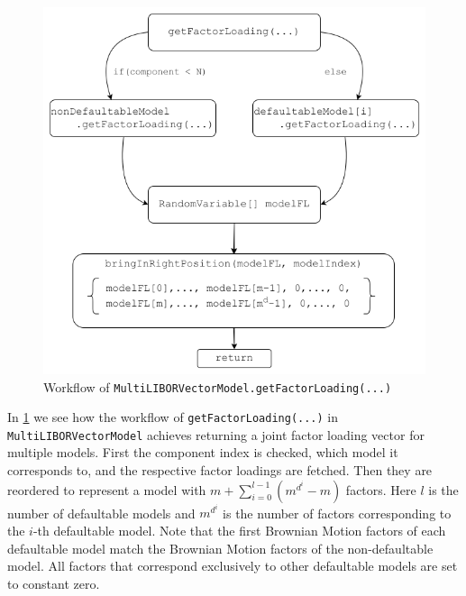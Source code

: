 \documentclass[12pt]{article}
\begin{document}
	\begin{figure}[h]
		\centering
		\includegraphics[width=0.6\linewidth]{figures/MultiModelGetFactorLoading}
		\caption[Workflow of \texttt{MultiLIBORVectorModel.getFactorLoading(...)}]{Workflow of \texttt{MultiLIBORVectorModel.getFactorLoading(...)}}
		\label{fig:multimodelgetfactorloading}
	\end{figure}
	
	In \cref{fig:multimodelgetfactorloading} we see how the workflow of \texttt{getFactorLoading(...)} in \texttt{MultiLIBORVectorModel} achieves returning a joint factor loading vector for multiple models. First the component index is checked, which model it corresponds to, and the respective factor loadings are fetched. Then they are reordered to represent a model with $m + \sum_{i=0}^{l-1}\left(m^{d^i}-m\right)$ factors. Here $l$ is the number of defaultable models and $m^{d^i}$ is the number of factors corresponding to the $i$-th defaultable model. Note that the first Brownian Motion factors of each defaultable model match the Brownian Motion factors of the non-defaultable model. All factors that correspond exclusively to other defaultable models are set to constant zero.
	
	
	\pagebreak
\end{document}
